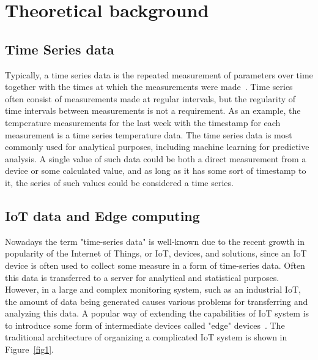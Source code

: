 \section{Theoretical background}
\subsection{Time Series data}
Typically, a time series data is the repeated measurement of parameters over time together with the times at which the measurements were made~\cite{time_series_databases}. Time series often consist of measurements made at regular intervals, but the regularity of time intervals between measurements is not a requirement. As an example, the temperature measurements for the last week with the timestamp for each measurement is a time series temperature data. The time series data is most commonly used for analytical purposes, including machine learning for predictive analysis. A single value of such data could be both a direct measurement from a device or some calculated value, and as long as it has some sort of timestamp to it, the series of such values could be considered a time series.

\subsection{IoT data and Edge computing}
Nowadays the term "time-series data" is well-known due to the recent growth in popularity of the Internet of Things, or IoT, devices, and solutions, since an IoT device is often used to collect some measure in a form of time-series data. Often this data is transferred to a server for analytical and statistical purposes. However, in a large and complex monitoring system, such as an industrial IoT, the amount of data being generated causes various problems for transferring and analyzing this data. A popular way of extending the capabilities of IoT system is to introduce some form of intermediate devices called "edge" devices~\cite{ind_iot_edge}. The traditional architecture of organizing a complicated IoT system is shown in Figure~\ref{fig1}.


